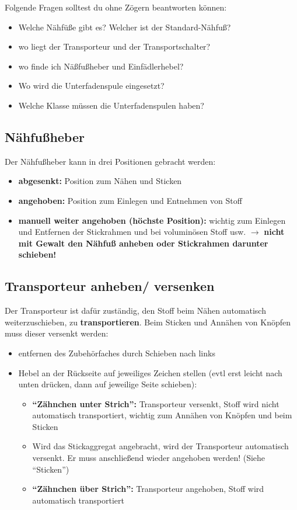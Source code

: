 \documentclass{\basedir/fablab-document}
\begin{document}
\vspace{2em}

Folgende Fragen solltest du ohne Zögern beantworten können:
\begin{itemize}
 \item Welche Nähfüße gibt es? Welcher ist der Standard-Nähfuß?
 \item wo liegt der Transporteur und der Transportschalter?
 \item wo finde ich Näßfußheber und Einfädlerhebel?
 \item Wo wird die Unterfadenspule eingesetzt?
 \item Welche Klasse müssen die Unterfadenspulen haben?
\end{itemize}


\subsection{Nähfußheber}
Der Nähfußheber kann in drei Positionen gebracht werden:
\begin{itemize}
 \item \textbf{abgesenkt:} Position zum Nähen und Sticken
 \item \textbf{angehoben:} Position zum Einlegen und Entnehmen von Stoff 
 \item \textbf{manuell weiter angehoben (höchste Position):} wichtig zum Einlegen und Entfernen der Stickrahmen und bei voluminösen Stoff usw. $\rightarrow$ \textbf{nicht mit Gewalt den Nähfuß anheben oder Stickrahmen darunter schieben!}
\end{itemize}

\subsection{Transporteur anheben/ versenken}
Der Transporteur ist dafür zuständig, den Stoff beim Nähen automatisch weiterzuschieben, zu \textbf{transportieren}. 
\newline Beim Sticken und Annähen von Knöpfen muss dieser versenkt werden:
\begin{itemize}
 \item entfernen des Zubehörfaches durch Schieben nach links
 \item Hebel an der Rückseite auf jeweiliges Zeichen stellen (evtl erst leicht nach unten drücken, dann auf jeweilige Seite schieben):
	\begin{itemize}
 	 \item \textbf{“Zähnchen unter Strich”:} Transporteur versenkt, Stoff wird nicht automatisch
transportiert, wichtig zum Annähen von Knöpfen und beim Sticken
 	 \item Wird das Stickaggregat angebracht, wird der Transporteur automatisch versenkt. Er muss anschließend wieder angehoben werden! (Siehe “Sticken”)
 	 \item \textbf{“Zähnchen über Strich”:} Transporteur angehoben, Stoff wird automatisch transportiert 
	\end{itemize}
\end{itemize}
\end{document}
